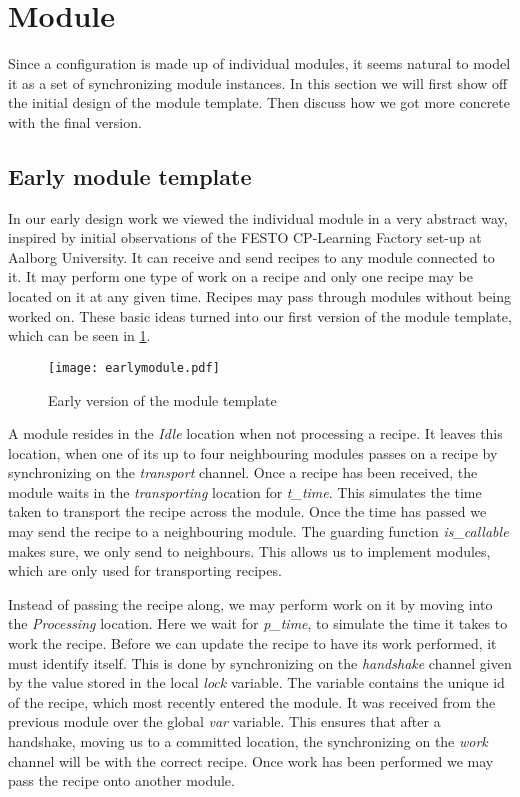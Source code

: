 \section{Module}
\label{subs:module}
Since a configuration is made up of individual modules, it seems natural to model it as a set of synchronizing module instances. In this section we will first show off the initial design of the module template. Then discuss how we got more concrete with the final version.

\subsection{Early module template}
In our early design work we viewed the individual module in a very abstract way, inspired by initial observations of the FESTO CP-Learning Factory set-up at Aalborg University. It can receive and send recipes to any module connected to it. It may perform one type of work on a recipe and only one recipe may be located on it at any given time. Recipes may pass through modules without being worked on. 
These basic ideas turned into our first version of the module template, which can be seen in \cref{fig:earlymodule}.


\begin{figure}[h]
\centering
\texttt{[image: earlymodule.pdf]}
\caption{Early version of the module template}
\label{fig:earlymodule}
\end{figure}

A module resides in the \emph{Idle} location when not processing a recipe. It leaves this location, when one of its up to four neighbouring modules passes on a recipe by synchronizing on the \emph{transport} channel. Once a recipe has been received, the module waits in the \emph{transporting} location for \emph{t\_time}. This simulates the time taken to transport the recipe across the module. Once the time has passed we may send the recipe to a neighbouring module. The guarding function \emph{is\_callable} makes sure, we only send to neighbours. This allows us to implement modules, which are only used for transporting recipes.

Instead of passing the recipe along, we may perform work on it by moving into the \emph{Processing} location. Here we wait for \emph{p\_time}, to simulate the time it takes to work the recipe. Before we can update the recipe to have its work performed, it must identify itself. This is done by synchronizing on the \emph{handshake} channel given by the value stored in the local \emph{lock} variable. The variable contains the unique id of the recipe, which most recently entered the module. It was received from the previous module over the global \emph{var} variable. This ensures that after a handshake, moving us to a committed location, the synchronizing on the \emph{work} channel will be with the correct recipe. Once work has been performed we may pass the recipe onto another module. 

